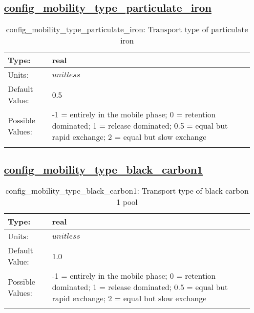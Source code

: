 \subsection[config\_mobility\_type\_particulate\_iron]{\hyperref[sec:nm_tab_biogeochemistry]{config\_mobility\_type\_particulate\_iron}}
\label{subsec:nm_sec_config_mobility_type_particulate_iron}
\begin{center}
\begin{longtable}{| p{2.0in} || p{4.0in} |}
    \hline
    Type: & real \\
    \hline
    Units: & $unitless$ \\
    \hline
    Default Value: & 0.5 \\
    \hline
    Possible Values: & -1 = entirely in the mobile phase; 0 = retention dominated;     1 = release dominated; 0.5 = equal but rapid exchange;     2 = equal but slow exchange \\
    \hline
    \caption{config\_mobility\_type\_particulate\_iron: Transport type of particulate iron}
\end{longtable}
\end{center}
\subsection[config\_mobility\_type\_black\_carbon1]{\hyperref[sec:nm_tab_biogeochemistry]{config\_mobility\_type\_black\_carbon1}}
\label{subsec:nm_sec_config_mobility_type_black_carbon1}
\begin{center}
\begin{longtable}{| p{2.0in} || p{4.0in} |}
    \hline
    Type: & real \\
    \hline
    Units: & $unitless$ \\
    \hline
    Default Value: & 1.0 \\
    \hline
    Possible Values: & -1 = entirely in the mobile phase; 0 = retention dominated;     1 = release dominated; 0.5 = equal but rapid exchange;     2 = equal but slow exchange \\
    \hline
    \caption{config\_mobility\_type\_black\_carbon1: Transport type of black carbon 1 pool}
\end{longtable}
\end{center}
